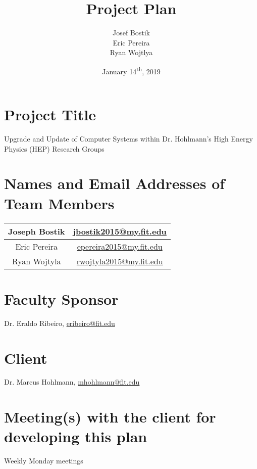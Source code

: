 \documentclass[12pt]{article}
\newcommand\tab[1][1cm]{\hspace*{#1}}
\begin{document}
\begin{titlepage}
	

\author{Josef Bostik\\
	Eric Pereira\\
	Ryan Wojtlya\\}
\date{January 14\textsuperscript{th}, 2019}
\title{Project Plan}
\maketitle
\end{titlepage}
\tableofcontents
\newpage
{}

\section{Project Title}
\tab Upgrade and Update of Computer Systems within Dr. Hohlmann's High Energy Physics (HEP) Research Groups
\section{Names and Email Addresses of Team Members}
\tab
\begin{tabular}{| c | c |}
	\hline
	Joseph Bostik & \href{mailto: jbostik2015@my.fit.edu}{jbostik2015@my.fit.edu} \\
	\hline
	Eric Pereira & \href{mailto: epereira2015@my.fit.edu}{epereira2015@my.fit.edu} \\
	\hline
	Ryan Wojtyla & \href{mailto: rwojtyla2015@my.fit.edu}{rwojtyla2015@my.fit.edu} \\
	\hline
\end{tabular}

\section{Faculty Sponsor}
\tab Dr. Eraldo Ribeiro, \href{mailto: eribeiro@fit.edu}{eribeiro@fit.edu}

\section{Client}
\tab Dr. Marcus Hohlmann, \href{mailto: mhohlmann@fit.edu}{mhohlmann@fit.edu}

\section{Meeting(s) with the client for developing this plan}
\tab Weekly Monday meetings
\end{document}
